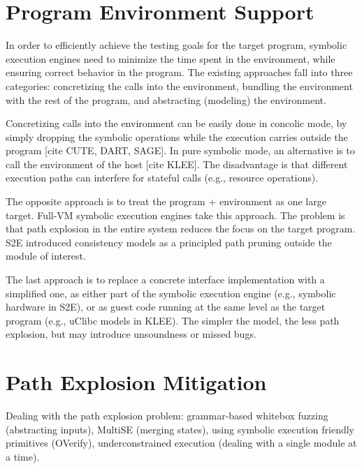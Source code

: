 
\section{Program Environment Support}

In order to efficiently achieve the testing goals for the target program, symbolic execution engines need to minimize the time spent in the environment, while ensuring correct behavior in the program.
%
The existing approaches fall into three categories: concretizing the calls into the environment, bundling the environment with the rest of the program, and abstracting (modeling) the environment.

Concretizing calls into the environment can be easily done in concolic mode, by simply dropping the symbolic operations while the execution carries outside the program [cite CUTE, DART, SAGE].  In pure symbolic mode, an alternative is to call the environment of the host [cite KLEE].  The disadvantage is that different execution paths can interfere for stateful calls (e.g., resource operations).

The opposite approach is to treat the program + environment as one large target.  Full-VM symbolic execution engines take this approach.  The problem is that path explosion in the entire system reduces the focus on the target program.  S2E introduced consistency models as a principled path pruning outside the module of interest.

The last approach is to replace a concrete interface implementation with a simplified one, as either part of the symbolic execution engine (e.g., symbolic hardware in S2E), or as guest code running at the same level as the target program (e.g., uClibc models in KLEE).  The simpler the model, the less path explosion, but may introduce unsoundness or missed bugs.


\section{Path Explosion Mitigation}

Dealing with the path explosion problem: grammar-based whitebox fuzzing (abstracting inputs), MultiSE (merging states), using symbolic execution friendly primitives (OVerify), underconstrained execution (dealing with a single module at a time).

